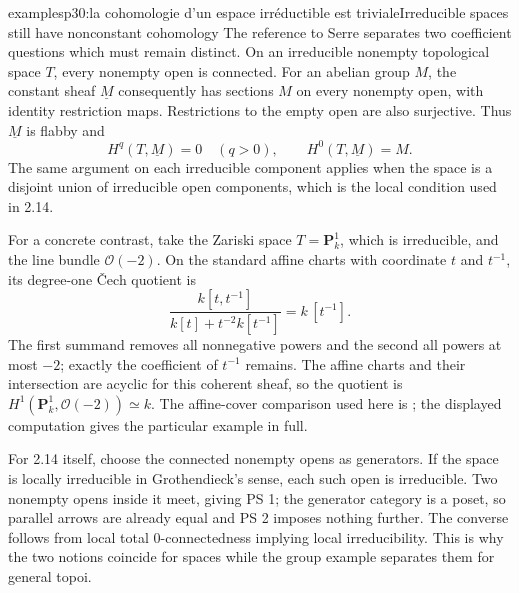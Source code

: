 \begin{dcomment}{examples}{p30:la cohomologie d'un espace irréductible est triviale}{Irreducible spaces still have nonconstant cohomology}
The reference to Serre separates two coefficient questions which must remain distinct. On an irreducible nonempty topological space $T$, every nonempty open is connected. For an abelian group $M$, the constant sheaf $\underline M$ consequently has sections $M$ on every nonempty open, with identity restriction maps. Restrictions to the empty open are also surjective. Thus $\underline M$ is flabby and
\[
 H^q(T,\underline M)=0\quad(q>0),\qquad
 H^0(T,\underline M)=M.
\]
The same argument on each irreducible component applies when the space is a disjoint union of irreducible open components, which is the local condition used in 2.14.

For a concrete contrast, take the Zariski space $T=\mathbf P^1_k$, which is irreducible, and the line bundle $\mathcal O(-2)$. On the standard affine charts with coordinate $t$ and $t^{-1}$, its degree-one \v{C}ech quotient is
\[
 \frac{k[t,t^{-1}]}{k[t]+t^{-2}k[t^{-1}]}
   =k\,[t^{-1}].
\]
The first summand removes all nonnegative powers and the second all powers at most $-2$; exactly the coefficient of $t^{-1}$ remains. The affine charts and their intersection are acyclic for this coherent sheaf, so the quotient is $H^1(\mathbf P^1_k,\mathcal O(-2))\simeq k$. The affine-cover comparison used here is \citet[no.~47, Theorem 4]{Serre1955FAC}; the displayed computation gives the particular example in full.

For 2.14 itself, choose the connected nonempty opens as generators. If the space is locally irreducible in Grothendieck's sense, each such open is irreducible. Two nonempty opens inside it meet, giving PS 1; the generator category is a poset, so parallel arrows are already equal and PS 2 imposes nothing further. The converse follows from local total $0$-connectedness implying local irreducibility. This is why the two notions coincide for spaces while the group example separates them for general topoi.
\end{dcomment}

